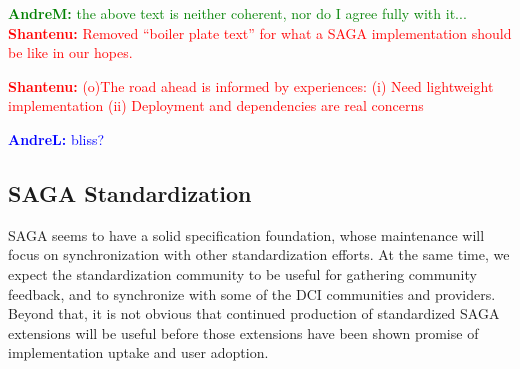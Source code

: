 \documentclass{article}
\newcommand{\B}[1]{\textbf{#1}}
\newcommand{\jhanote}[1]{{\textcolor{red}{     \B{Shantenu:} #1 }}}
\newcommand{\amnote}[1]{{\textcolor{green}{   \B{AndreM:  } #1 }}}
\newcommand{\alnote}[1]{{\textcolor{blue}{    \B{AndreL:  } #1 }}}
\newcommand{\hknote}[1]{{\textcolor{red}{  \B{Hartmut: } #1 }}}
\newcommand{\jhanote}[1]{}
\newcommand{\amnote}[1]{}
\newcommand{\alnote}[1]{}
\newcommand{\hknote}[1]{}
\begin{document}


  \amnote{the above text is neither coherent, nor do I agree fully with it...}
  \jhanote{Removed ``boiler plate text'' for what a SAGA implementation should
  be like in our hopes.}

  \jhanote{(o)The road ahead is informed by experiences: (i) Need lightweight
  implementation (ii) Deployment and dependencies are real concerns}
    
  \alnote{bliss?}



 \subsection{SAGA Standardization}

  SAGA seems to have a solid specification foundation, whose
  maintenance will focus on synchronization with other
  standardization efforts.  At the same time, we expect the
  standardization community to be useful for gathering community
  feedback, and to synchronize with some of the DCI communities and
  providers.  Beyond that, it is not obvious that continued production
  of standardized SAGA extensions will be useful before those
  extensions have been shown promise of implementation uptake and user
  adoption.  
  
\end{document}
